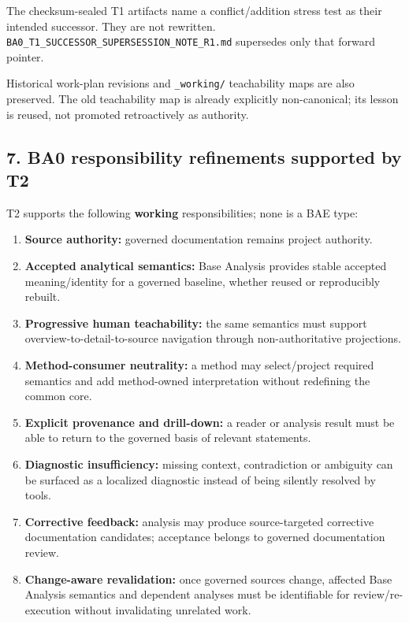 \documentclass[
  10pt,
  a4paper,
]{article}
\providecommand{\tightlist}{%
  \setlength{\itemsep}{0pt}\setlength{\parskip}{0pt}}
\begin{document}
The checksum-sealed T1 artifacts name a conflict/addition stress test as
their intended successor. They are not rewritten.
\texttt{BA0\_T1\_SUCCESSOR\_SUPERSESSION\_NOTE\_R1.md} supersedes only
that forward pointer.

Historical work-plan revisions and \texttt{\_working/} teachability maps
are also preserved. The old teachability map is already explicitly
non-canonical; its lesson is reused, not promoted retroactively as
authority.

\subsection{7. BA0 responsibility refinements supported by
T2}\label{7-ba0-responsibility-refinements-supported-by-t2}

T2 supports the following \textbf{working} responsibilities; none is a
BAE type:

\begin{enumerate}
\def\labelenumi{\arabic{enumi}.}
\tightlist
\item
  \textbf{Source authority:} governed documentation remains project
  authority.
\item
  \textbf{Accepted analytical semantics:} Base Analysis provides stable
  accepted meaning/identity for a governed baseline, whether reused or
  reproducibly rebuilt.
\item
  \textbf{Progressive human teachability:} the same semantics must
  support overview-to-detail-to-source navigation through
  non-authoritative projections.
\item
  \textbf{Method-consumer neutrality:} a method may select/project
  required semantics and add method-owned interpretation without
  redefining the common core.
\item
  \textbf{Explicit provenance and drill-down:} a reader or analysis
  result must be able to return to the governed basis of relevant
  statements.
\item
  \textbf{Diagnostic insufficiency:} missing context, contradiction or
  ambiguity can be surfaced as a localized diagnostic instead of being
  silently resolved by tools.
\item
  \textbf{Corrective feedback:} analysis may produce source-targeted
  corrective documentation candidates; acceptance belongs to governed
  documentation review.
\item
  \textbf{Change-aware revalidation:} once governed sources change,
  affected Base Analysis semantics and dependent analyses must be
  identifiable for review/re-execution without invalidating unrelated
  work.
\end{enumerate}
\end{document}
